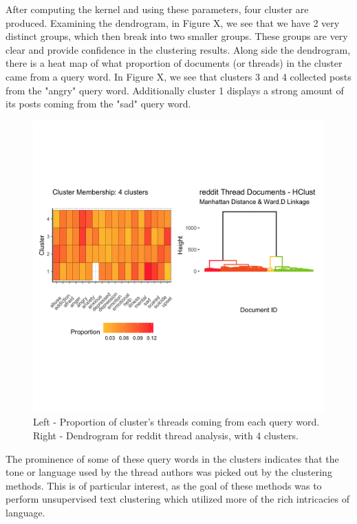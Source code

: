 After computing the kernel and using these parameters, four cluster are produced. Examining the dendrogram, in Figure X, we see that we have 2 very distinct groups, which then break into two smaller groups. These groups are very clear and provide confidence in the clustering results. Along side the dendrogram, there is a heat map of what proportion of documents (or threads) in the cluster came from a query word. In Figure X, we see that clusters 3 and 4 collected posts from the "angry" query word. Additionally cluster 1 displays a 
strong amount of its posts coming from the "sad" query word. \\

\begin{figure}
\includegraphics[width=6in]{Content/Images/k4_reddit_clusters.png}
\caption{Left - Proportion of cluster's threads coming from each query word. Right - Dendrogram for reddit thread analysis, with 4 clusters.}
\end{figure}

The prominence of some of these query words in the clusters indicates that the tone or language used by the thread authors was picked out by the clustering methods. This is of particular interest, as the goal of these methods was to perform unsupervised text clustering which utilized more of the rich intricacies of language.\\

